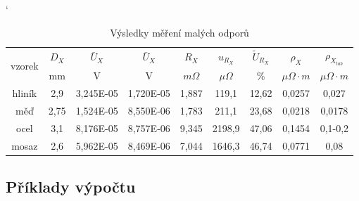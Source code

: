 \documentclass[a4paper, czech]{article}
\begin{document}
\begin{table}[H]
    \catcode`
    \centering
    \caption{Výsledky měření malých odporů}
    \begin{tabular}{ccccccccc}
        \toprule
        \multirow{2}{*}{vzorek} & $D_X$   & $\bar{U}_X$        & $\bar{U}_X$        & $R_X$    & $u_{R_X}$    & $\tilde{U}_{R_X}$   & $\rho_X$     & $\rho_{X_{tab}}$   \\
        \cmidrule{2-9}
                                & mm   & V         & V         & $m \Omega$  & $\mu \Omega$   & \%    & $\mu \Omega \cdot m$ &    $\mu \Omega \cdot m$     \\
        \midrule
        hliník                  & 2,9  & 3,245E-05 & 1,720E-05 & 1,887 & 119,1  & 12,62 & 0,0257 & 0,027   \\
        měď                     & 2,75 & 1,524E-05 & 8,550E-06 & 1,783 & 211,1  & 23,68 & 0,0218 & 0,0178  \\
        ocel                    & 3,1  & 8,176E-05 & 8,757E-06 & 9,345 & 2198,9 & 47,06 & 0,1454 & 0,1-0,2 \\
        mosaz                   & 2,6  & 5,962E-05 & 8,469E-06 & 7,044 & 1646,3 & 46,74 & 0,0771 & 0,08 \\
        \bottomrule
    \end{tabular}
\end{table}

\break

\subsection{Příklady výpočtu}
\end{document}
